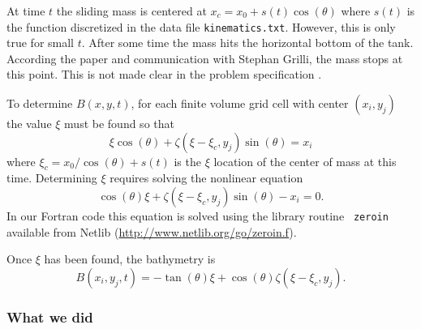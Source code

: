 At time $t$ the sliding mass is centered at $x_c = x_0 + s(t)\cos(\theta)$
where $s(t)$ is the function discretized in the data file
{\tt kinematics.txt}.    However, this is only true for small $t$.  After
some time the mass hits the horizontal bottom of the tank.  According the
paper \cite{EnetGrilli} and communication with Stephan Grilli, the mass stops at
this point.  This is not made clear in the problem specification 
\cite{bp-description}.


To determine $B(x,y,t)$, for each finite volume grid cell with center 
$(x_i, y_j)$ the value $\xi$ must be found so that
\[
\xi\cos(\theta) + \zeta(\xi - \xi_c,y_j)\sin(\theta) = x_i
\]
where $\xi_c = x_0/\cos(\theta) + s(t)$  is the $\xi$ location of the center
of mass at this time.
Determining $\xi$ requires solving the nonlinear equation
\[
\cos(\theta)\xi + \zeta(\xi - \xi_c, y_j) \sin(\theta) - x_i = 0.
\]
In our Fortran code this equation is solved using the library routine {\tt
zeroin} available from Netlib (\url{http://www.netlib.org/go/zeroin.f}).

Once $\xi$ has been found, the bathymetry is 
\[
B(x_i,y_j,t) =
-\tan(\theta)\xi + \cos(\theta)\zeta(\xi - \xi_c, y_j).
\]


\subsubsection{What we did}\label{sec:bp3what}


